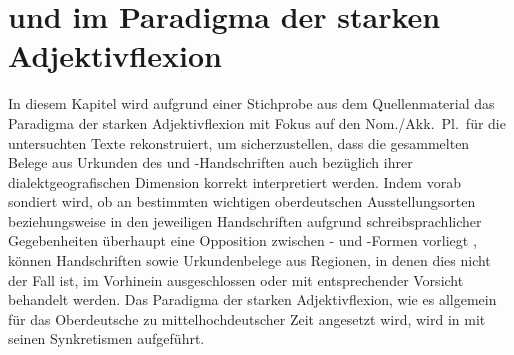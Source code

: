 \chapter{ und  im Paradigma der starken Adjektivflexion}
\label{ch:adjflex}

In diesem Kapitel wird aufgrund einer Stichprobe aus dem Quellenmaterial das
Paradigma der starken Adjektivflexion mit Fokus auf den Nom./Akk.\ Pl.\ für die
untersuchten Texte rekonstruiert, um sicherzustellen, dass die gesammelten
Belege aus Urkunden des \CAO{} und \KC{}-Handschriften auch bezüglich ihrer
dialektgeografischen Dimension korrekt interpretiert werden. Indem vorab
sondiert wird, ob an bestimmten wichtigen oberdeutschen Ausstellungs\-orten
beziehungsweise in den jeweiligen Handschriften aufgrund schreibsprachlicher
Gegebenheiten überhaupt eine Opposition zwischen - und -Formen
vorliegt \autocite[vgl.][182]{ksw2}, können Handschriften sowie Urkundenbelege
aus Regionen, in denen dies nicht der Fall ist, im Vorhinein ausgeschlossen
oder mit entsprechender Vorsicht behandelt werden. Das Paradigma der starken
Adjektivflexion, wie es allgemein für das Oberdeutsche zu mittelhochdeutscher
Zeit angesetzt wird, wird in
 mit seinen Synkretismen
aufgeführt.

